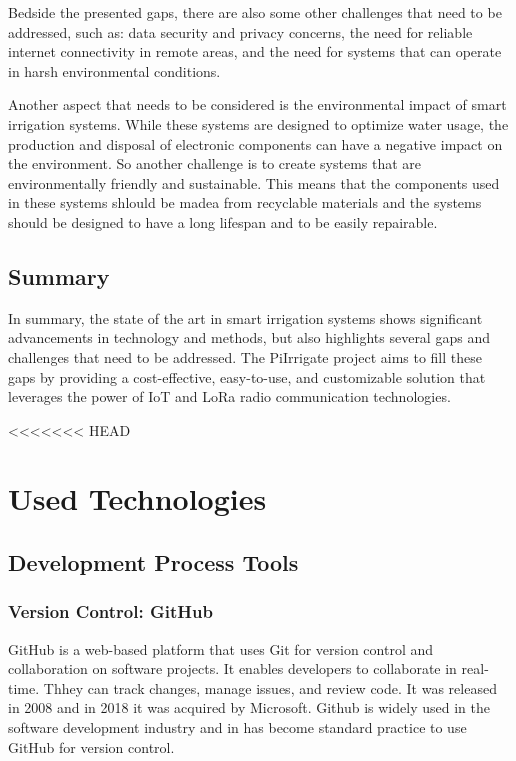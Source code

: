 Bedside the presented gaps, there are also some other challenges that need to be addressed, such as:
data security and privacy concerns, the need for reliable internet connectivity in remote areas, 
and the need for systems that can operate in harsh environmental conditions. 

Another aspect that needs to be considered is the environmental impact of smart irrigation systems.
While these systems are designed to optimize water usage,
the production and disposal of electronic components can have a negative impact on the environment.
So another challenge is to create systems that are environmentally friendly and sustainable. This means 
that the components used in these systems shlould be madea from recyclable materials 
and the systems should be designed to have a long lifespan and to be easily repairable.

\section{Summary}
In summary, the state of the art in smart irrigation systems shows significant 
advancements in technology and methods, but also highlights several gaps and challenges 
that need to be addressed. The PiIrrigate project aims to fill these gaps by providing a
cost-effective, easy-to-use, and customizable solution that leverages the power of IoT and LoRa 
radio communication technologies.

<<<<<<< HEAD
\chapter{Used Technologies}
\section{Development Process Tools}
\subsection{Version Control: GitHub}
GitHub is a web-based platform that uses Git for version control and collaboration on software projects.
It enables developers to collaborate in real-time. Thhey can track changes, manage issues, and review code.
It was released in 2008 and in 2018 it was acquired by Microsoft\cite{githubDefinition}.
Github is widely used in the software development industry and in has become standard practice to 
use GitHub for version control. 

